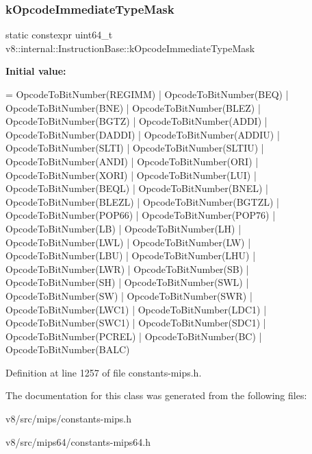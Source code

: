 \subsubsection{\texorpdfstring{k\+Opcode\+Immediate\+Type\+Mask}{kOpcodeImmediateTypeMask}}
{\footnotesize\ttfamily static constexpr uint64\+\_\+t v8\+::internal\+::\+Instruction\+Base\+::k\+Opcode\+Immediate\+Type\+Mask\hspace{0.3cm}{\ttfamily [static]}}

{\bfseries Initial value\+:}
\begin{DoxyCode}
=
      OpcodeToBitNumber(REGIMM) | OpcodeToBitNumber(BEQ) |
      OpcodeToBitNumber(BNE) | OpcodeToBitNumber(BLEZ) |
      OpcodeToBitNumber(BGTZ) | OpcodeToBitNumber(ADDI) |
      OpcodeToBitNumber(DADDI) | OpcodeToBitNumber(ADDIU) |
      OpcodeToBitNumber(SLTI) | OpcodeToBitNumber(SLTIU) |
      OpcodeToBitNumber(ANDI) | OpcodeToBitNumber(ORI) |
      OpcodeToBitNumber(XORI) | OpcodeToBitNumber(LUI) |
      OpcodeToBitNumber(BEQL) | OpcodeToBitNumber(BNEL) |
      OpcodeToBitNumber(BLEZL) | OpcodeToBitNumber(BGTZL) |
      OpcodeToBitNumber(POP66) | OpcodeToBitNumber(POP76) |
      OpcodeToBitNumber(LB) | OpcodeToBitNumber(LH) | OpcodeToBitNumber(LWL) |
      OpcodeToBitNumber(LW) | OpcodeToBitNumber(LBU) | OpcodeToBitNumber(LHU) |
      OpcodeToBitNumber(LWR) | OpcodeToBitNumber(SB) | OpcodeToBitNumber(SH) |
      OpcodeToBitNumber(SWL) | OpcodeToBitNumber(SW) | OpcodeToBitNumber(SWR) |
      OpcodeToBitNumber(LWC1) | OpcodeToBitNumber(LDC1) |
      OpcodeToBitNumber(SWC1) | OpcodeToBitNumber(SDC1) |
      OpcodeToBitNumber(PCREL) | OpcodeToBitNumber(BC) |
      OpcodeToBitNumber(BALC)
\end{DoxyCode}


Definition at line 1257 of file constants-\/mips.\+h.



The documentation for this class was generated from the following files\+:\begin{DoxyCompactItemize}
\item 
v8/src/mips/constants-\/mips.\+h\item 
v8/src/mips64/constants-\/mips64.\+h\end{DoxyCompactItemize}
